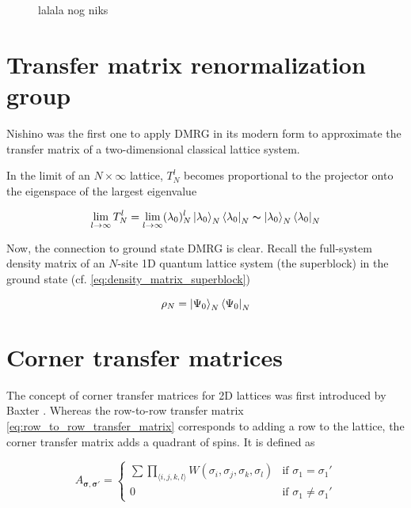 \begin{figure}
  \caption{lalala nog niks}
  \label{fig:transfer_matrix_as_tensor_network}
\end{figure}



\section{Transfer matrix renormalization group}

Nishino \cite{nishino1995density} was the first one to apply DMRG in its modern
form to approximate the transfer matrix of a two-dimensional classical lattice system.

In the limit of an $N \times \infty$ lattice, $T_{N}^{l}$ becomes proportional
to the projector onto the eigenspace of the largest eigenvalue

\begin{equation}
  \lim_{l \to \infty} T_{N}^{l} = \lim_{l \to \infty} (\lambda_0)_{N}^{l} \ket{\lambda_0}_{N}\bra{\lambda_0}_{N} \thicksim \ket{\lambda_0}_{N}\bra{\lambda_0}_N
\end{equation}

Now, the connection to ground state DMRG is clear. Recall the full-system
density matrix of an $N$-site 1D quantum lattice system (the superblock) in the
ground state (cf. \eqref{eq:density_matrix_superblock})

\begin{equation}
  \rho_N = \ket{\Psi_0}_{N}\bra{\Psi_0}_{N}
\end{equation}





\section{Corner transfer matrices}

The concept of corner transfer matrices for 2D lattices was first introduced by
Baxter \cite{baxter1968dimers, baxter1978variational, baxter1982exactly}.
Whereas the row-to-row transfer matrix \eqref{eq:row_to_row_transfer_matrix}
corresponds to adding a row to the lattice, the corner transfer matrix adds
a quadrant of spins. It is defined as

\begin{equation}
  A_{\bm{\sigma}, \bm{\sigma'}} =
  \begin{cases}
    \sum \prod_{\langle i, j, k, l \rangle} W(\sigma_i, \sigma_j, \sigma_k, \sigma_l) & \text{if } \sigma_{1} = \sigma_{1}' \\
    0 & \text{if } \sigma_{1} \neq \sigma_{1}'
  \end{cases}
\end{equation}

